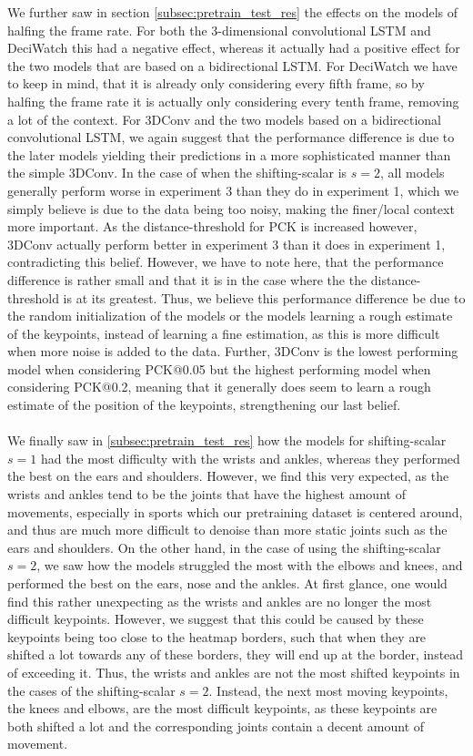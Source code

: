 \documentclass[./main.tex]{subfiles}
\begin{document}
We further saw in section \ref{subsec:pretrain_test_res} the effects on the models of halfing the frame rate. For both the 3-dimensional convolutional LSTM and DeciWatch this had a negative effect, whereas it actually had a positive effect for the two models that are based on a bidirectional LSTM. For DeciWatch we have to keep in mind, that it is already only considering every fifth frame, so by halfing the frame rate it is actually only considering every tenth frame, removing a lot of the context. For 3DConv and the two models based on a bidirectional convolutional LSTM, we again suggest that the performance difference is due to the later models yielding their predictions in a more sophisticated manner than the simple 3DConv. In the case of when the shifting-scalar is $s = 2$, all models generally perform worse in experiment 3 than they do in experiment 1, which we simply believe is due to the data being too noisy, making the finer/local context more important. As the distance-threshold for PCK is increased however, 3DConv actually perform better in experiment 3 than it does in experiment 1, contradicting this belief. However, we have to note here, that the performance difference is rather small and that it is in the case where the the distance-threshold is at its greatest. Thus, we believe this performance difference be due to the random initialization of the models or the models learning a rough estimate of the keypoints, instead of learning a fine estimation, as this is more difficult when more noise is added to the data. Further, 3DConv is the lowest performing model when considering PCK@0.05 but the highest performing model when considering PCK@0.2, meaning that it generally does seem to learn a rough estimate of the position of the keypoints, strengthening our last belief.
\\
\\
We finally saw in \ref{subsec:pretrain_test_res} how the models for shifting-scalar $s = 1$ had the most difficulty with the wrists and ankles, whereas they performed the best on the ears and shoulders. However, we find this very expected, as the wrists and ankles tend to be the joints that have the highest amount of movements, especially in sports which our pretraining dataset is centered around, and thus are much more difficult to denoise than more static joints such as the ears and shoulders. On the other hand, in the case of using the shifting-scalar $s = 2$, we saw how the models struggled the most with the elbows and knees, and performed the best on the ears, nose and the ankles. At first glance, one would find this rather unexpecting as the wrists and ankles are no longer the most difficult keypoints. However, we suggest that this could be caused by these keypoints being too close to the heatmap borders, such that when they are shifted a lot towards any of these borders, they will end up at the border, instead of exceeding it. Thus, the wrists and ankles are not the most shifted keypoints in the cases of the shifting-scalar $s = 2$. Instead, the next most moving keypoints, the knees and elbows, are the most difficult keypoints, as these keypoints are both shifted a lot and the corresponding joints contain a decent amount of movement.
\end{document}
